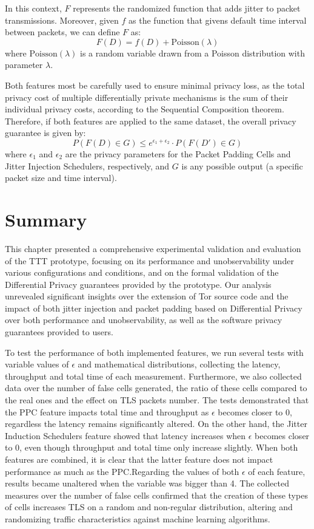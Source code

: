In this context, $F$ represents the randomized function that adds jitter to packet transmissions. Moreover, given $f$ as the function that givens default time interval between packets, we can define $F$ as:
\[F(D) = f(D) + \text{Poisson}(\lambda)\]
where $\text{Poisson}(\lambda)$ is a random variable drawn from a Poisson distribution with parameter $\lambda$.

Both features most be carefully used to ensure minimal privacy loss, as the total privacy cost of multiple differentially private mechanisms is the sum of their individual privacy costs, according to the Sequential Composition theorem. Therefore, if both features are applied to the same dataset, the overall privacy guarantee is given by:
\[P(F(D) \in G) \leq e^{\epsilon_1 + \epsilon_2} \cdot P(F(D') \in G)\]
where $\epsilon_1$ and $\epsilon_2$ are the privacy parameters for the Packet Padding Cells and Jitter Injection Schedulers, respectively, and $G$ is any possible output (a specific packet size and time interval).


\section{Summary}\label{sec:validation_summary} %

This chapter presented a comprehensive experimental validation and evaluation of the TTT prototype, focusing on its performance and unobservability under various configurations and conditions, and on the formal validation of the Differential Privacy guarantees provided by the prototype. Our analysis unrevealed significant insights over the extension of Tor source code and the impact of both jitter injection and packet padding based on Differential Privacy over both performance and unobservability, as well as the software privacy guarantees provided to users. 

To test the performance of both implemented features, we run several tests with variable values of $\epsilon$ and mathematical distributions, collecting the latency, throughput and total time of each measurement. Furthermore, we also collected data over the number of false cells generated, the ratio of these cells compared to the real ones and the effect on TLS packets number.
The tests demonstrated that the PPC feature impacts total time and throughput as $\epsilon$ becomes closer to 0, regardless the latency remains significantly altered. On the other hand, the Jitter Induction Schedulers feature showed that latency increases when $\epsilon$ becomes closer to 0, even though throughput and total time only increase slightly. When both features are combined, it is clear that the latter feature does not impact performance as much as the PPC.\@ Regarding the values of both $\epsilon$ of each feature, results became unaltered when the variable was bigger than 4.
The collected measures over the number of false cells confirmed that the creation of these types of cells increases TLS on a random and non-regular distribution, altering and randomizing traffic characteristics against machine learning algorithms.

